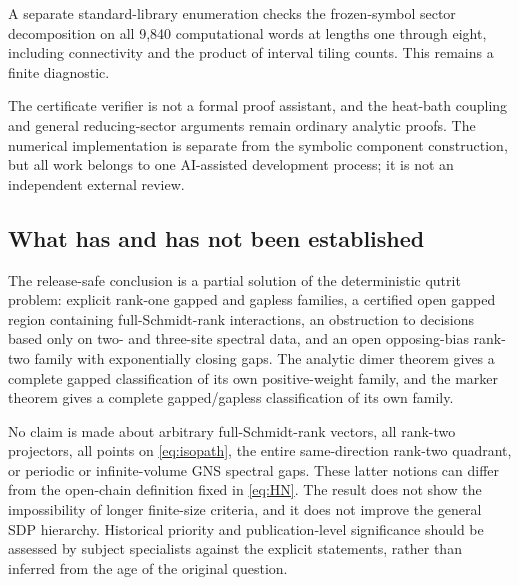 \documentclass[11pt,a4paper]{article}
\theoremstyle{remark}\newtheorem{remark}[theorem]{Remark}
\begin{document}
A separate standard-library enumeration checks the frozen-symbol sector decomposition on all 9,840 computational words at lengths one through eight, including connectivity and the product of interval tiling counts. This remains a finite diagnostic.

The certificate verifier is not a formal proof assistant, and the heat-bath coupling and general reducing-sector arguments remain ordinary analytic proofs. The numerical implementation is separate from the symbolic component construction, but all work belongs to one AI-assisted development process; it is not an independent external review.

\subsection{What has and has not been established}
The release-safe conclusion is a partial solution of the deterministic qutrit problem: explicit rank-one gapped and gapless families, a certified open gapped region containing full-Schmidt-rank interactions, an obstruction to decisions based only on two- and three-site spectral data, and an open opposing-bias rank-two family with exponentially closing gaps. The analytic dimer theorem gives a complete gapped classification of its own positive-weight family, and the marker theorem gives a complete gapped/gapless classification of its own family.

No claim is made about arbitrary full-Schmidt-rank vectors, all rank-two projectors, all points on \eqref{eq:isopath}, the entire same-direction rank-two quadrant, or periodic or infinite-volume GNS spectral gaps. These latter notions can differ from the open-chain definition fixed in \eqref{eq:HN}. The result does not show the impossibility of longer finite-size criteria, and it does not improve the general SDP hierarchy. Historical priority and publication-level significance should be assessed by subject specialists against the explicit statements, rather than inferred from the age of the original question.
\end{document}

